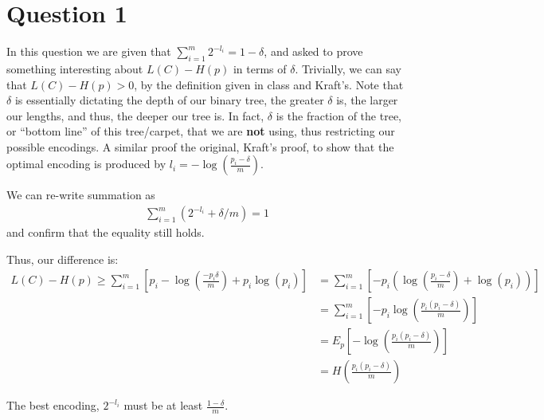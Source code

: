 \section{Question 1}

In this question we are given that $\sum_{i=1}^{m}2^{-l_i} = 1 - \delta$, and asked to prove something interesting about $L(C) - H(p)$ in terms of $\delta$.  Trivially, we can say that $L(C) - H(p) > 0$, by the definition given in class and Kraft's.
Note that $\delta$ is essentially dictating the depth of our binary tree, the greater $\delta$ is, the larger our lengths, and thus, the deeper our tree is.
In fact, $\delta$ is the fraction of the tree, or ``bottom line'' of this tree/carpet, that we are {\bf not} using, thus restricting our possible encodings.
A similar proof the original, Kraft's proof, to show that the optimal encoding is produced by $l_i = -\log(\frac{p_i-\delta}{m})$.

We can re-write summation as
\begin{align*}
\sum_{i=1}^{m}(2^{-l_i} +\delta/m) = 1
\end{align*}
and confirm that the equality still holds.

Thus, our difference is:
\begin{align*}
L(C) - H(p) \geq \sum_{i=1}^{m}[p_i-\log(\frac{-p_i\delta}{m}) + p_i\log(p_i)] &= \sum_{i=1}^{m}[-p_i(\log(\frac{p_i-\delta}{m}) + \log(p_i))]\\
&= \sum_{i=1}^{m}[-p_i\log(\frac{p_i(p_i-\delta)}{m})]\\
&= E_p[-\log(\frac{p_i(p_i-\delta)}{m})]\\
&= H(\frac{p_i(p_i-\delta)}{m})
\end{align*}

The best encoding, $2^{-l_i}$ must be at least $\frac{1-\delta}{m}$.

